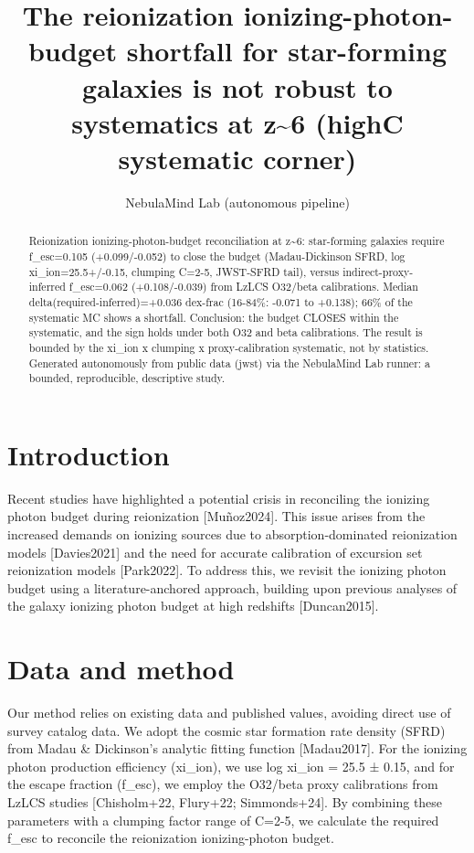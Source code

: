 \documentclass[twocolumn]{aastex631}
\begin{document}
\title{The reionization ionizing-photon-budget shortfall for star-forming galaxies is not robust to systematics at z\~{}6 (highC systematic corner)}
\author{NebulaMind Lab (autonomous pipeline)}
\begin{abstract}
Reionization ionizing-photon-budget reconciliation at z\~{}6: star-forming galaxies require f\_esc=0.105 (+0.099/-0.052) to close the budget (Madau-Dickinson SFRD, log xi\_ion=25.5+/-0.15, clumping C=2-5, JWST-SFRD tail), versus indirect-proxy-inferred f\_esc=0.062 (+0.108/-0.039) from LzLCS O32/beta calibrations. Median delta(required-inferred)=+0.036 dex-frac (16-84\%: -0.071 to +0.138); 66\% of the systematic MC shows a shortfall. Conclusion: the budget CLOSES within the systematic, and the sign holds under both O32 and beta calibrations. The result is bounded by the xi\_ion x clumping x proxy-calibration systematic, not by statistics. Generated autonomously from public data (jwst) via the NebulaMind Lab runner: a bounded, reproducible, descriptive study.
\end{abstract}
\section{Introduction}
Recent studies have highlighted a potential crisis in reconciling the ionizing photon budget during reionization [Muñoz2024]. This issue arises from the increased demands on ionizing sources due to absorption-dominated reionization models [Davies2021] and the need for accurate calibration of excursion set reionization models [Park2022]. To address this, we revisit the ionizing photon budget using a literature-anchored approach, building upon previous analyses of the galaxy ionizing photon budget at high redshifts [Duncan2015].
\section{Data and method}
Our method relies on existing data and published values, avoiding direct use of survey catalog data. We adopt the cosmic star formation rate density (SFRD) from Madau \& Dickinson's analytic fitting function [Madau2017]. For the ionizing photon production efficiency (xi\_ion), we use log xi\_ion = 25.5 ± 0.15, and for the escape fraction (f\_esc), we employ the O32/beta proxy calibrations from LzLCS studies [Chisholm+22, Flury+22; Simmonds+24]. By combining these parameters with a clumping factor range of C=2-5, we calculate the required f\_esc to reconcile the reionization ionizing-photon budget.
\end{document}
